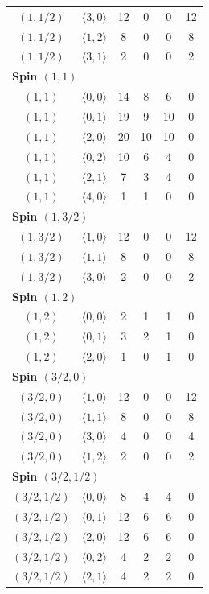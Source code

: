 \begin{longtable}{c c c c c c}
$(1,1/2)$ & $\langle 3,0\rangle$ & 12 & 0 & 0 & 12 \\
$(1,1/2)$ & $\langle 1,2\rangle$ & 8 & 0 & 0 & 8 \\
$(1,1/2)$ & $\langle 3,1\rangle$ & 2 & 0 & 0 & 2 \\
\midrule
\multicolumn{6}{l}{\textbf{Spin $(1,1)$}}\\
$(1,1)$ & $\langle 0,0\rangle$ & 14 & 8 & 6 & 0 \\
$(1,1)$ & $\langle 0,1\rangle$ & 19 & 9 & 10 & 0 \\
$(1,1)$ & $\langle 2,0\rangle$ & 20 & 10 & 10 & 0 \\
$(1,1)$ & $\langle 0,2\rangle$ & 10 & 6 & 4 & 0 \\
$(1,1)$ & $\langle 2,1\rangle$ & 7 & 3 & 4 & 0 \\
$(1,1)$ & $\langle 4,0\rangle$ & 1 & 1 & 0 & 0 \\
\midrule
\multicolumn{6}{l}{\textbf{Spin $(1,3/2)$}}\\
$(1,3/2)$ & $\langle 1,0\rangle$ & 12 & 0 & 0 & 12 \\
$(1,3/2)$ & $\langle 1,1\rangle$ & 8 & 0 & 0 & 8 \\
$(1,3/2)$ & $\langle 3,0\rangle$ & 2 & 0 & 0 & 2 \\
\midrule
\multicolumn{6}{l}{\textbf{Spin $(1,2)$}}\\
$(1,2)$ & $\langle 0,0\rangle$ & 2 & 1 & 1 & 0 \\
$(1,2)$ & $\langle 0,1\rangle$ & 3 & 2 & 1 & 0 \\
$(1,2)$ & $\langle 2,0\rangle$ & 1 & 0 & 1 & 0 \\
\midrule
\multicolumn{6}{l}{\textbf{Spin $(3/2,0)$}}\\
$(3/2,0)$ & $\langle 1,0\rangle$ & 12 & 0 & 0 & 12 \\
$(3/2,0)$ & $\langle 1,1\rangle$ & 8 & 0 & 0 & 8 \\
$(3/2,0)$ & $\langle 3,0\rangle$ & 4 & 0 & 0 & 4 \\
$(3/2,0)$ & $\langle 1,2\rangle$ & 2 & 0 & 0 & 2 \\
\midrule
\multicolumn{6}{l}{\textbf{Spin $(3/2,1/2)$}}\\
$(3/2,1/2)$ & $\langle 0,0\rangle$ & 8 & 4 & 4 & 0 \\
$(3/2,1/2)$ & $\langle 0,1\rangle$ & 12 & 6 & 6 & 0 \\
$(3/2,1/2)$ & $\langle 2,0\rangle$ & 12 & 6 & 6 & 0 \\
$(3/2,1/2)$ & $\langle 0,2\rangle$ & 4 & 2 & 2 & 0 \\
$(3/2,1/2)$ & $\langle 2,1\rangle$ & 4 & 2 & 2 & 0 \\

\end{longtable}
